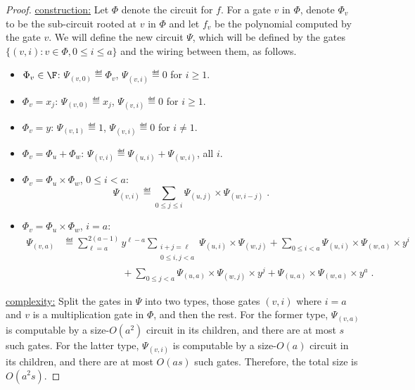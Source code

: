 \documentclass[11pt]{article}
\numberwithin{equation}{section}
\theoremstyle{definition}
\theoremstyle{plain}
\begin{document}
\begin{proof}
        \uline{construction:} Let $\Phi$ denote the circuit for $f$. For a gate $v$ in $\Phi$, denote $\Phi_v$ to be the sub-circuit rooted at $v$ in $\Phi$ and let $f_v$   be the polynomial computed by the gate $v$.  We will define the new circuit $\Psi$, which will be defined by the gates $\{(v,i): v\in\Phi, 0\le i\le a\}$ and the wiring between them, as follows.
        \begin{itemize}
                \item $\Phi_v\in\F$: $\Psi_{(v,0)}\eqdef \Phi_v$, $\Psi_{(v,i)}\eqdef 0$ for $i\ge 1$.
                \item $\Phi_v=x_j$: $\Psi_{(v,0)}\eqdef x_j$, $\Psi_{(v,i)}\eqdef 0$ for $i\ge 1$.
                \item $\Phi_v=y$: $\Psi_{(v,1)}\eqdef 1$, $\Psi_{(v,i)}\eqdef 0$ for $i\ne 1$.
                \item $\Phi_v=\Phi_u+\Phi_w$: $\Psi_{(v,i)}\eqdef \Psi_{(u,i)}+\Psi_{(w,i)}$, all $i$.
                \item $\Phi_v=\Phi_u\times \Phi_w$, $0\le i<a$:
                        \[
                                \Psi_{(v,i)}\eqdef \sum_{0\le j\le i}\Psi_{(u,j)}\times\Psi_{(w,i-j)}
                                \;.
                        \]
                \item $\Phi_v=\Phi_u\times \Phi_w$, $i=a$:
                        \begin{align*}
                                \Psi_{(v,a)}
                                &\eqdef \sum_{\ell=a}^{2(a-1)}y^{\ell-a}\sum_{\substack{i+j=\ell\\0\le i,j< a}}\Psi_{(u,i)}\times\Psi_{(w,j)}
                                        + \sum_{0\le i<a} \Psi_{(u,i)}\times\Psi_{(w,a)}\times y^i\\
                                &\hspace{1in}+ \sum_{0\le j<a} \Psi_{(u,a)}\times\Psi_{(w,j)}\times y^j
                                        +\Psi_{(u,a)}\times\Psi_{(w,a)}\times y^a
                                \;.
                        \end{align*}
        \end{itemize}

        \uline{complexity:} Split the gates in $\Psi$ into two types, those gates $(v,i)$ where $i=a$ and $v$ is a multiplication gate in $\Phi$, and then the rest.  For the former type, $\Psi_{(v,a)}$ is computable by a size-$O(a^2)$ circuit in its children, and there are at most $s$ such gates.  For the latter type, $\Psi_{(v,i)}$ is computable by a size-$O(a)$ circuit in its children, and there are at most $O(as)$ such gates.
Therefore, %
the total size is $O(a^2s)$.
%



\end{proof}
\end{document}
